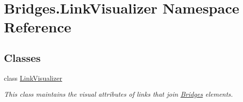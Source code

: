 \hypertarget{namespace_bridges_1_1_link_visualizer}{}\section{Bridges.\+Link\+Visualizer Namespace Reference}
\label{namespace_bridges_1_1_link_visualizer}
\subsection*{Classes}
\begin{DoxyCompactItemize}
\item 
class \mbox{\hyperlink{class_bridges_1_1_link_visualizer_1_1_link_visualizer}{Link\+Visualizer}}
\begin{DoxyCompactList}\small\item\em This class maintains the visual attributes of links that join \mbox{\hyperlink{namespace_bridges_1_1_bridges}{Bridges}} elements. \end{DoxyCompactList}\end{DoxyCompactItemize}
